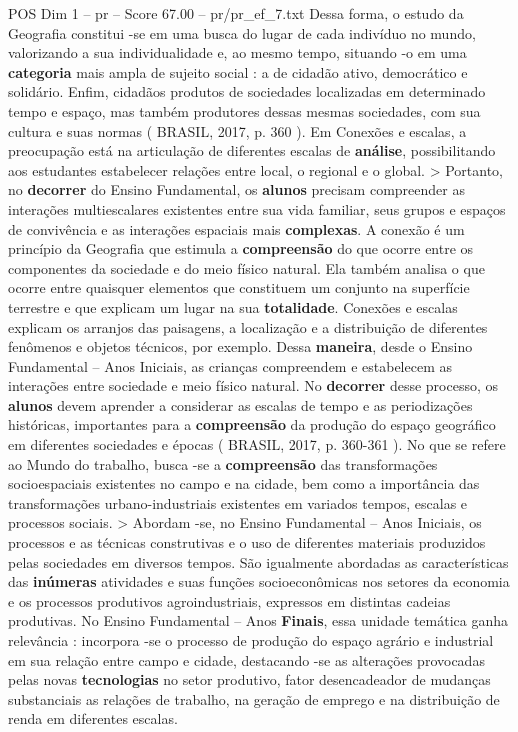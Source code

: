 \begin{textsample}{POS Dim 1 – pr – Score 67.00 – pr/pr\_ef\_7.txt}
Dessa forma, o estudo da Geografia constitui -se em uma busca do lugar de cada indivíduo no mundo, valorizando a sua individualidade e, ao mesmo tempo, situando -o em uma \textbf{categoria} mais ampla de sujeito social : a de cidadão ativo, democrático e solidário.
Enfim, cidadãos produtos de sociedades localizadas em determinado tempo e espaço, mas também produtores dessas mesmas sociedades, com sua cultura e suas normas ( BRASIL, 2017, p. 360 ).
Em Conexões e escalas, a preocupação está na articulação de diferentes escalas de \textbf{análise}, possibilitando aos estudantes estabelecer relações entre local, o regional e o global. > Portanto, no \textbf{decorrer} do Ensino Fundamental, os \textbf{alunos} precisam compreender as interações multiescalares existentes entre sua vida familiar, seus grupos e espaços de convivência e as interações espaciais mais \textbf{complexas}.
A conexão é um princípio da Geografia que estimula a \textbf{compreensão} do que ocorre entre os componentes da sociedade e do meio físico natural.
Ela também analisa o que ocorre entre quaisquer elementos que constituem um conjunto na superfície terrestre e que explicam um lugar na sua \textbf{totalidade}.
Conexões e escalas explicam os arranjos das paisagens, a localização e a distribuição de diferentes fenômenos e objetos técnicos, por exemplo.
Dessa \textbf{maneira}, desde o Ensino Fundamental – Anos Iniciais, as crianças compreendem e estabelecem as interações entre sociedade e meio físico natural.
No \textbf{decorrer} desse processo, os \textbf{alunos} devem aprender a considerar as escalas de tempo e as periodizações históricas, importantes para a \textbf{compreensão} da produção do espaço geográfico em diferentes sociedades e épocas ( BRASIL, 2017, p. 360-361 ).
No que se refere ao Mundo do trabalho, busca -se a \textbf{compreensão} das transformações socioespaciais existentes no campo e na cidade, bem como a importância das transformações urbano-industriais existentes em variados tempos, escalas e processos sociais. > Abordam -se, no Ensino Fundamental – Anos Iniciais, os processos e as técnicas construtivas e o uso de diferentes materiais produzidos pelas sociedades em diversos tempos.
São igualmente abordadas as características das \textbf{inúmeras} atividades e suas funções socioeconômicas nos setores da economia e os processos produtivos agroindustriais, expressos em distintas cadeias produtivas.
No Ensino Fundamental – Anos \textbf{Finais}, essa unidade temática ganha relevância : incorpora -se o processo de produção do espaço agrário e industrial em sua relação entre campo e cidade, destacando -se as alterações provocadas pelas novas \textbf{tecnologias} no setor produtivo, fator desencadeador de mudanças substanciais as relações de trabalho, na geração de emprego e na distribuição de renda em diferentes escalas.

\end{textsample}
